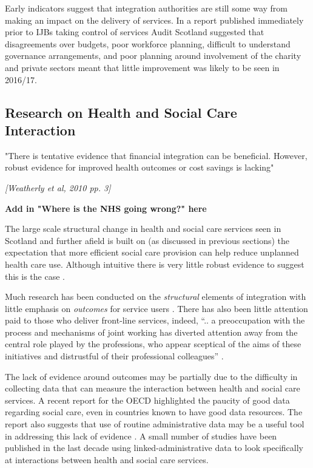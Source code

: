 \documentclass[12pt,]{report}
\begin{document}
Early indicators suggest that integration authorities are still some way
from making an impact on the delivery of services. In a report published
immediately prior to IJBs taking control of services Audit Scotland
\citeyearpar{RN252} suggested that disagreements over budgets, poor
workforce planning, difficult to understand governance arrangements, and
poor planning around involvement of the charity and private sectors
meant that little improvement was likely to be seen in 2016/17.

\subsection{Research on Health and Social Care Interaction}\label{subsec:research}

\epigraph{"There is tentative evidence that financial integration can be beneficial. However, robust evidence for improved health outcomes or cost savings is lacking"}{\textit{[Weatherly et al, 2010 pp. 3]}}

\textbf{Add in "Where is the NHS going wrong?" here}

The large scale structural change in health and social care services
seen in Scotland and further afield is built on (as discussed in
previous sections) the expectation that more efficient social care
provision can help reduce unplanned health care use. Although intuitive
there is very little robust evidence to suggest this is the case
\citep{RN367, RN234, RN233, RN231, RN362, RN260, RN366, RN467, RN369}.

Much research has been conducted on the \textit{structural} elements of
integration with little emphasis on \textit{outcomes} for service users
\citep{RN141}. There has also been little attention paid to those who
deliver front-line services, indeed, ``.. a preoccupation with the
process and mechanisms of joint working has diverted attention away from
the central role played by the professions, who appear sceptical of the
aims of these initiatives and distrustful of their professional
colleagues'' \citep[pp.12]{RN467}.

The lack of evidence around outcomes may be partially due to the
difficulty in collecting data that can measure the interaction between
health and social care services. A recent report for the OECD
\citeyearpar{RN406} highlighted the paucity of good data regarding
social care, even in countries known to have good data resources. The
report also suggests that use of routine administrative data may be a
useful tool in addressing this lack of evidence \citep{RN406}. A small
number of studies have been published in the last decade using
linked-administrative data to look specifically at interactions between
health and social care services.
\end{document}
